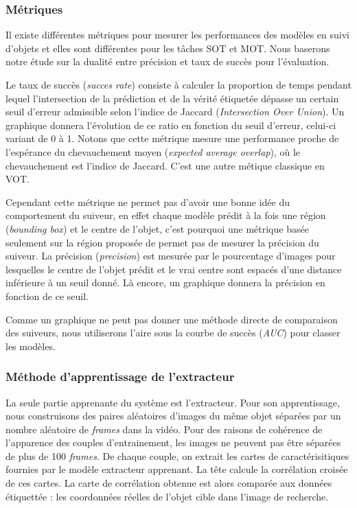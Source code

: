 \documentclass[10pt,twocolumn,letterpaper,french]{article}
\begin{document}
\subsubsection*{Métriques}
\label{metrics}


Il existe différentes métriques pour mesurer les performances des modèles en suivi d'objets et elles sont différentes pour les tâches SOT et MOT. Nous baserons notre étude sur la dualité entre précision et taux de succès pour l'évaluation.

Le taux de succès (\textit{succes rate}) consiste à calculer la proportion de temps pendant lequel l'intersection de la prédiction et de la vérité étiquetée dépasse un certain seuil d'erreur admissible selon l'indice de Jaccard (\textit{Intersection Over Union}). Un graphique donnera l'évolution de ce ratio en fonction du seuil d'erreur, celui-ci variant de 0 à 1. Notons que cette métrique mesure une performance proche de l'espérance du chevauchement moyen (\textit{expected average overlap}), où le chevauchement est l'indice de Jaccard. C'est une autre métique classique en VOT.

Cependant cette métrique ne permet pas d'avoir une bonne idée du comportement du suiveur, en effet chaque modèle prédit à la fois une région (\textit{bounding box}) et le centre de l'objet, c'est pourquoi une métrique basée seulement sur la région proposée de permet pas de mesurer la précision du suiveur. La précision (\textit{precision}) est mesurée par le pourcentage d'images pour lesquelles le centre de l'objet prédit et le vrai centre sont espacés d'une distance inférieure à un seuil donné. Là encore, un graphique donnera la précision en fonction de ce seuil.

Comme un graphique ne peut pas donner une méthode directe de comparaison des suiveurs, nous utiliserons l'aire sous la courbe de succès (\textit{AUC}) pour classer les modèles. 

\subsubsection*{Méthode d'apprentissage de l'extracteur}

La seule partie apprenante du système est l'extracteur. Pour son apprentissage, nous construisons des paires aléatoires d'images du même objet séparées par un nombre aléatoire de \textit{frames} dans la vidéo. Pour des raisons de cohérence de l'apparence des couples d'entrainement, les images ne peuvent pas être séparées de plus de 100 \textit{frames}. De chaque couple, on extrait les cartes de caractérisitiques fournies par le modèle extracteur apprenant. La tête calcule la corrélation croisée de ces cartes. La carte de corrélation obtenue est alors comparée aux données étiquettée : les coordonnées réelles de l'objet cible dans l'image de recherche.
\end{document}
